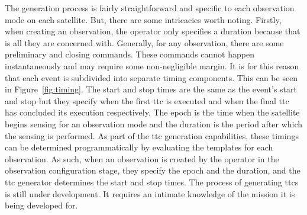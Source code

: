 The generation process is fairly straightforward and specific to
each observation mode on each satellite. But, there are some intricacies worth
noting. Firstly, when creating an observation, the operator only specifies a
duration because that is all they are concerned with.  Generally, for any
observation, there are some preliminary and closing commands. These commands
cannot happen instantaneously and may require some non-negligible margin. It is
for this reason that each event is subdivided into separate timing components.
This can be seen in Figure~\ref{fig:timing}. The start and stop times are the
same as the event’s start and stop but they specify when the first \gls{ttc} is
executed and when the final \gls{ttc} has concluded its execution respectively.
The epoch is the time when the satellite begins sensing for an observation mode
and the duration is the period after which the sensing is performed. As part of
the \gls{ttc} generation capabilities, these timings can be determined
programmatically by evaluating the templates for each observation. As such,
when an observation is created by the operator in the observation configuration
stage, they specify the epoch and the duration, and the \gls{ttc} generator
determines the start and stop times. The process of generating \glspl{ttc} is
still under development. It requires an intimate knowledge of the mission it is
being developed for. 





